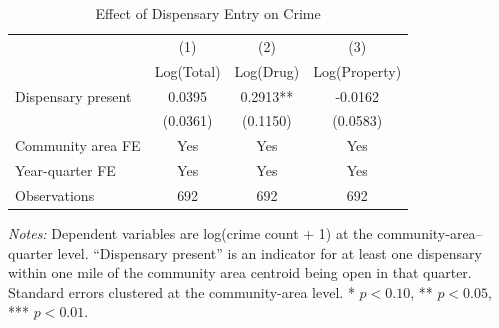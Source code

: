 \begin{table}[H]
\centering
\caption{Effect of Dispensary Entry on Crime}
\label{tab:crime}
\begin{threeparttable}
\begin{tabular}{lccc}
\toprule
 & (1) & (2) & (3) \\
 & Log(Total) & Log(Drug) & Log(Property) \\
\midrule
Dispensary present & 0.0395 & 0.2913** & -0.0162 \\
 & (0.0361) & (0.1150) & (0.0583) \\[4pt]
\midrule
Community area FE & Yes & Yes & Yes \\
Year-quarter FE & Yes & Yes & Yes \\
Observations & 692 & 692 & 692 \\
\bottomrule
\end{tabular}
\begin{tablenotes}[flushleft]
\small
\textit{Notes:} Dependent variables are log(crime count + 1) at the community-area--quarter level. ``Dispensary present'' is an indicator for at least one dispensary within one mile of the community area centroid being open in that quarter. Standard errors clustered at the community-area level. * $p<0.10$, ** $p<0.05$, *** $p<0.01$.
\end{tablenotes}
\end{threeparttable}
\end{table}

